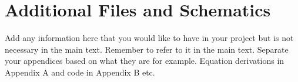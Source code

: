 \chapter{Additional Files and Schematics}

Add any information here that you would like to have in your project but is not necessary in the main
text. Remember to refer to it in the main text. Separate your appendices based on what they are for
example. Equation derivations in Appendix A and code in Appendix B etc.
